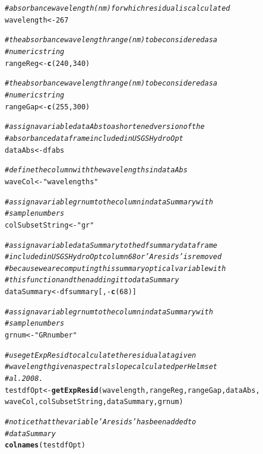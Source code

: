 \documentclass[a4paper,11pt]{article}\usepackage[]{graphicx}\usepackage[]{color}
\makeatletter
\newcommand{\hlnum}[1]{\textcolor[rgb]{0.686,0.059,0.569}{#1}}%
\newcommand{\hlstr}[1]{\textcolor[rgb]{0.192,0.494,0.8}{#1}}%
\newcommand{\hlcom}[1]{\textcolor[rgb]{0.678,0.584,0.686}{\textit{#1}}}%
\newcommand{\hlopt}[1]{\textcolor[rgb]{0,0,0}{#1}}%
\newcommand{\hlstd}[1]{\textcolor[rgb]{0.345,0.345,0.345}{#1}}%
\newcommand{\hlkwb}[1]{\textcolor[rgb]{0.69,0.353,0.396}{#1}}%
\newcommand{\hlkwd}[1]{\textcolor[rgb]{0.737,0.353,0.396}{\textbf{#1}}}%
\newenvironment{kframe}{%
 \def\at@end@of@kframe{}%
 \ifinner\ifhmode%
  \def\at@end@of@kframe{\end{minipage}}%
  \begin{minipage}{\columnwidth}%
 \fi\fi%
 \def\FrameCommand##1{\hskip\@totalleftmargin \hskip-\fboxsep
 \colorbox{shadecolor}{##1}\hskip-\fboxsep
     \hskip-\linewidth \hskip-\@totalleftmargin \hskip\columnwidth}%
 \MakeFramed {\advance\hsize-\width
   \@totalleftmargin\z@ \linewidth\hsize
   \@setminipage}}%
 {\par\unskip\endMakeFramed%
 \at@end@of@kframe}
\newenvironment{knitrout}{}{} %
\makeatother
\begin{document}
\begin{knitrout}
\color{fgcolor}\begin{kframe}
\begin{alltt}
\hlcom{# absorbance wavelength (nm) for which residual is calculated}
\hlstd{wavelength} \hlkwb{<-} \hlnum{267}

\hlcom{# the absorbance wavelength range (nm) to be considered as a}
\hlcom{# numeric string}
\hlstd{rangeReg} \hlkwb{<-} \hlkwd{c}\hlstd{(}\hlnum{240}\hlstd{,} \hlnum{340}\hlstd{)}

\hlcom{# the absorbance wavelength range (nm) to be considered as a}
\hlcom{# numeric string}
\hlstd{rangeGap} \hlkwb{<-} \hlkwd{c}\hlstd{(}\hlnum{255}\hlstd{,} \hlnum{300}\hlstd{)}

\hlcom{# assign a variable dataAbs to a shortened version of the}
\hlcom{# absorbance dataframe included in USGSHydroOpt}
\hlstd{dataAbs} \hlkwb{<-} \hlstd{dfabs}

\hlcom{# define the column with the wavelengths in dataAbs}
\hlstd{waveCol} \hlkwb{<-} \hlstr{"wavelengths"}

\hlcom{# assign a variable grnum to the column in dataSummary with}
\hlcom{# sample numbers}
\hlstd{colSubsetString} \hlkwb{<-} \hlstr{"gr"}

\hlcom{# assign a variable dataSummary to the dfsummary dataframe}
\hlcom{# included in USGSHydroOpt column 68 or 'Aresids' is removed}
\hlcom{# because we are computing this summary optical variable with}
\hlcom{# this function and then adding it to dataSummary}
\hlstd{dataSummary} \hlkwb{<-} \hlstd{dfsummary[,} \hlopt{-}\hlkwd{c}\hlstd{(}\hlnum{68}\hlstd{)]}

\hlcom{# assign a variable grnum to the column in dataSummary with}
\hlcom{# sample numbers}
\hlstd{grnum} \hlkwb{<-} \hlstr{"GRnumber"}

\hlcom{# use getExpResid to calculate the residual at a given}
\hlcom{# wavelength given a spectral slope calculated per Helms et}
\hlcom{# al. 2008.}
\hlstd{testdfOpt} \hlkwb{<-} \hlkwd{getExpResid}\hlstd{(wavelength, rangeReg, rangeGap, dataAbs,}
    \hlstd{waveCol, colSubsetString, dataSummary, grnum)}

\hlcom{# notice that the variable 'Aresids' has been added to}
\hlcom{# dataSummary}
\hlkwd{colnames}\hlstd{(testdfOpt)}
\end{alltt}
\end{kframe}
\end{knitrout}
\end{document}
